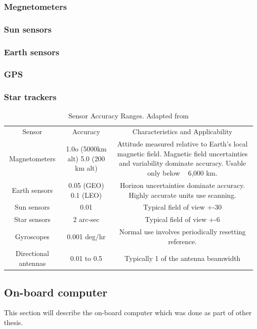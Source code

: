 \documentclass[12pt,a4paper,oneside]{article}
\begin{document}
\subsubsection{Megnetometers}
\subsubsection{Sun sensors}
\subsubsection{Earth sensors}
\subsubsection{GPS}
\subsubsection{Star trackers}

\cite{larson1992space}
\begin{table}[ht]

\begin{tabular}{ccc}
Sensor & Accuracy & Characteristics and Applicability \\ 
Magnetometers & 1.0o (5000km alt) 5.0 (200 km alt) & Attitude measured relative to Earth’s local magnetic field. Magnetic field uncertainties and variability dominate accuracy. Usable only below ~ 6,000 km. \\ 
Earth sensors & 0.05 (GEO) 0.1 (LEO) & Horizon uncertainties dominate accuracy. Highly accurate units use scanning. \\ 
Sun sensors & 0.01 & Typical field of view +-30 \\ 
Star sensors & 2 arc-sec & Typical field of view +-6 \\ 
Gyroscopes & 0.001 deg/hr & Normal use involves periodically resetting reference. \\ 
Directional antennas & 0.01 to 0.5 & Typically 1 of the antenna beamwidth

\end{tabular} 
\caption{Sensor Accuracy Ranges. Adapted from \cite{hall2003spacecraft}}

\end{table}
\cite{lima2000comparison}

\subsection{On-board computer}
This section will describe the on-board computer which was done as part of other thesis.
\end{document}
